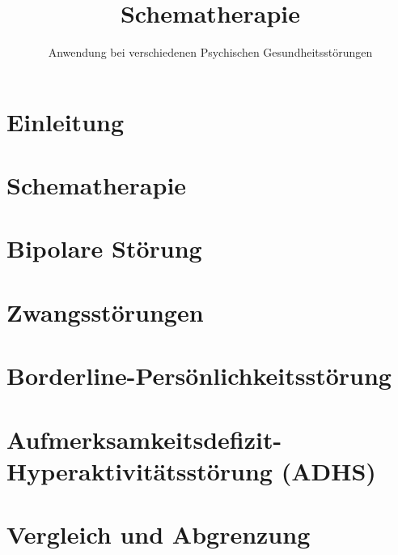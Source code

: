 \documentclass[ngerman]{scrreprt}
\begin{document}
\title{Schematherapie}
\subtitle{Anwendung bei verschiedenen Psychischen Gesundheitsstörungen}
\date{}

\maketitle

\setcounter{page}{1} 
\tableofcontents{}
\newpage

\setcounter{page}{1} 

\chapter{Einleitung}


\chapter{Schematherapie}










\chapter{Bipolare Störung}


\chapter{Zwangsstörungen}


\chapter{Borderline-Persönlichkeitsstörung}


\chapter{Aufmerksamkeitsdefizit-Hyperaktivitätsstörung (ADHS)}


\chapter{Vergleich und Abgrenzung}

\end{document}
